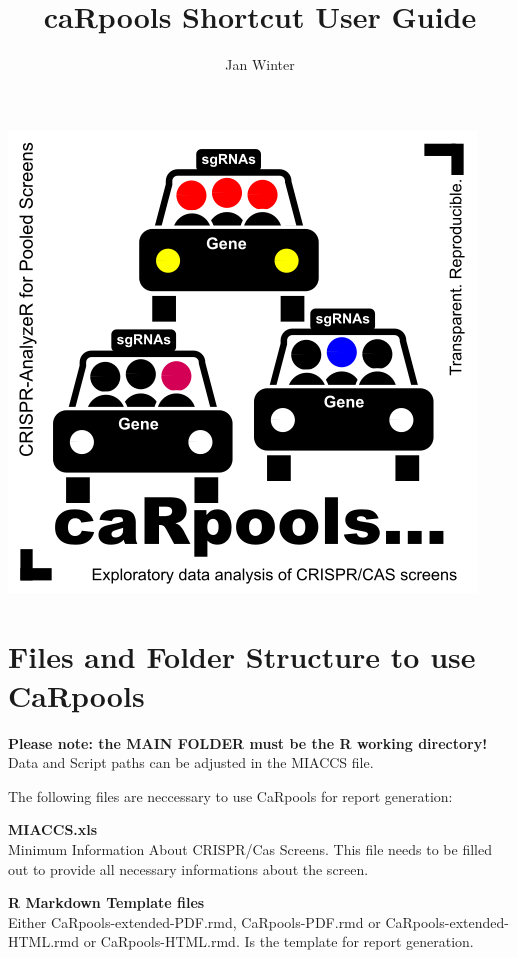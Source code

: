 \documentclass[]{article}
\title{caRpools Shortcut User Guide}
\author{Jan Winter}
\date{}
\begin{document}
\maketitle

{
\hypersetup{linkcolor=black}
\setcounter{tocdepth}{2}
\tableofcontents
}
\newpage

\includegraphics{./pictures/CaRpools.png}

\newpage

\section{Files and Folder Structure to use
CaRpools}\label{files-and-folder-structure-to-use-carpools}

\textbf{Please note: the MAIN FOLDER must be the R working directory!}\\
Data and Script paths can be adjusted in the MIACCS file.

The following files are neccessary to use CaRpools for report
generation:

\textbf{MIACCS.xls}\\
Minimum Information About CRISPR/Cas Screens. This file needs to be
filled out to provide all necessary informations about the screen.

\textbf{R Markdown Template files}\\
Either CaRpools-extended-PDF.rmd, CaRpools-PDF.rmd or
CaRpools-extended-HTML.rmd or CaRpools-HTML.rmd. Is the template for
report generation.
\end{document}
